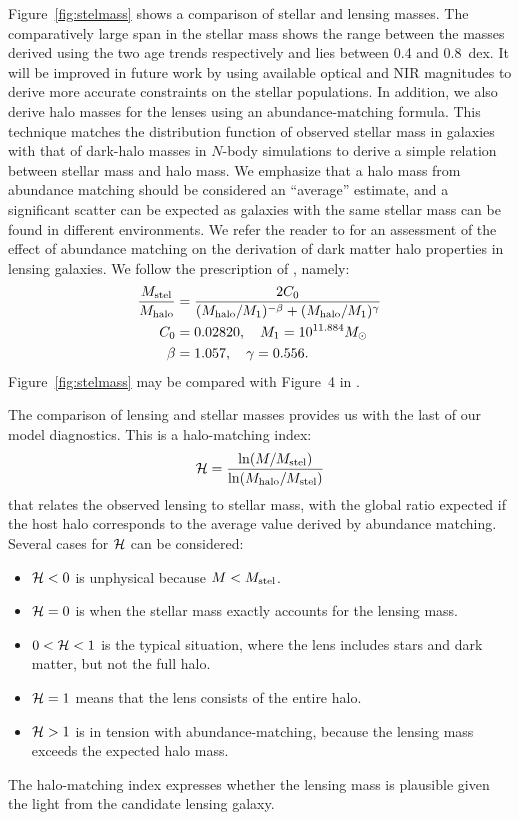 Figure~\ref{fig:stelmass} shows a comparison of stellar and lensing
masses.  The comparatively large span in the stellar mass shows the range 
between the masses derived using the two age trends respectively
and lies between 0.4 and 0.8~dex.
It will be improved in future work by using available optical and NIR 
magnitudes to derive more accurate constraints on the stellar populations.
In addition, we also derive halo masses for the lenses using an
abundance-matching formula.  This technique matches the distribution
function of observed stellar mass in galaxies with that of dark-halo
masses in $N$-body simulations to derive a simple relation between
stellar mass and halo mass.  We emphasize that a halo mass from
abundance matching should be considered an ``average'' estimate, and a
significant scatter can be expected as galaxies with the same stellar
mass can be found in different environments. We refer the reader to
\cite{2012MNRAS.424..104L} for an assessment of the effect of
abundance matching on the derivation of dark matter halo properties in
lensing galaxies. We follow the prescription of
\citet{2010ApJ...710..903M}, namely:
\begin{equation}
\begin{aligned}
\frac{M_\text{stel}}{M_\text{halo}} &= \frac{2C_0}{(M_\text{halo}/M_1)^{-\beta} +
                                     (M_\text{halo}/M_1)^\gamma} \\
C_0 &= 0.02820, \quad M_1 = 10^{11.884} M_\odot \\
\beta &= 1.057, \quad \gamma = 0.556.
\end{aligned}
\end{equation}
Figure~\ref{fig:stelmass} may be compared with Figure~4 in
\cite{2011ApJ...734...69M}.

The comparison of lensing and stellar masses provides us with the last
of our model diagnostics.  This is a halo-matching index:
\begin{equation}
\mathcal{H} = \frac{\ln(M/M_\text{stel})}{\ln(M_\text{halo}/M_\text{stel})}
\end{equation}
that relates the observed lensing to stellar mass, with the
global ratio expected if the host halo corresponds to the
average value derived by abundance matching. Several cases
for $\mathcal{H}$ can be considered:
\begin{itemize}
\item $\mathcal{H} < 0$ is unphysical because $M<M_\text{stel}$.
\item $\mathcal{H} = 0$ is when the stellar mass exactly accounts for the
  lensing mass.
\item $0 < \mathcal{H} < 1$ is the typical situation, where the lens
  includes stars and dark matter, but not the full halo.
\item $\mathcal{H} = 1$ means that the lens consists of the entire halo.
\item $\mathcal{H} > 1$ is in tension with abundance-matching, because the
  lensing mass exceeds the expected halo mass.
\end{itemize}
The halo-matching index expresses whether the lensing mass is
plausible given the light from the candidate lensing galaxy.

